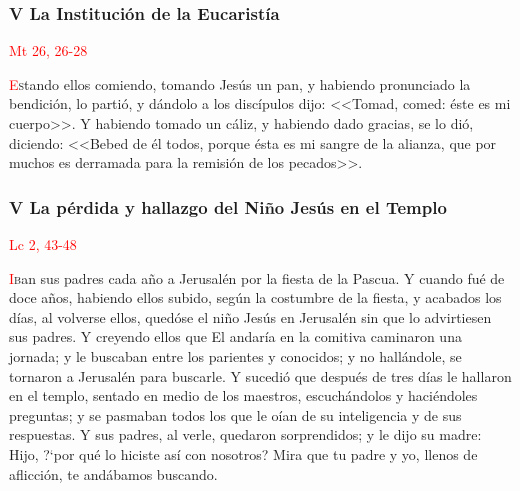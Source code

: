 \documentclass[10pt,twoside]{book}
\begin{document}


\begin{paracol}{2}
      \begin{leftcolumn}

            \noindent\subsubsection*{V La Institución de la Eucaristía}
            
            \vspace{-0.5em}

            \hfill\textcolor{red}{Mt 26, 26-28}
            
            \lettrine[lines=2]{\textcolor{red}{E}}stando ellos comiendo, tomando Jesús un pan, y habiendo pronunciado la bendición, lo partió, y dándolo a los discípulos dijo: <<Tomad, comed: éste es mi cuerpo>>.
            Y habiendo tomado un cáliz, y habiendo dado gracias, se lo dió, diciendo: <<Bebed de él todos, porque ésta es mi sangre de la alianza, que por muchos es derramada para la remisión de los pecados>>.
      \end{leftcolumn}
      \begin{rightcolumn}

            \noindent\subsubsection*{V La pérdida y hallazgo del Niño Jesús en el Templo}

            \vspace{-0.5em}

            \hfill\textcolor{red}{Lc 2, 43-48}

            \lettrine[lines=2]{\textcolor{red}{I}}ban sus padres cada año a Jerusalén por la fiesta de la Pascua. Y cuando fué de doce años, habiendo ellos subido, según la costumbre de la fiesta,
            y acabados los días, al volverse ellos, quedóse el niño Jesús en Jerusalén sin que lo advirtiesen sus padres. Y creyendo ellos que El andaría en la comitiva caminaron una jornada; y le
            buscaban entre los parientes y conocidos; y no hallándole, se tornaron a Jerusalén para buscarle. Y sucedió que después de tres días le hallaron en el templo,
            sentado en medio de los maestros, escuchándolos y haciéndoles preguntas; y se pasmaban todos los que le oían de su inteligencia y de sus respuestas.
            Y sus padres, al verle, quedaron sorprendidos; y le dijo su madre: Hijo, {?`}por qué lo hiciste así con nosotros? Mira que tu padre y yo, llenos de aflicción, 
            te andábamos buscando.
        \end{rightcolumn}
\end{paracol}
\end{document}
